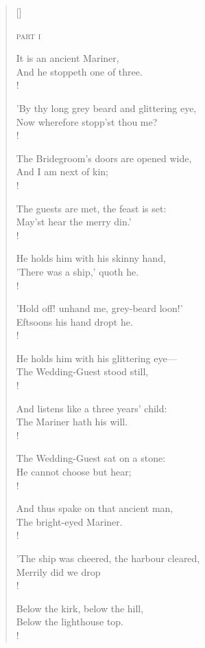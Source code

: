 \documentclass[12pt]{article}
\begin{document}
\begin{verse}[\linewidth]

\textsc{part i}

\bigskip
\bigskip

It is an ancient Mariner, \\
And he stoppeth one of three. \\!

'By thy long grey beard and glittering eye, \\
Now wherefore stopp'st thou me? \\!

The Bridegroom's doors are opened wide, \\
And I am next of kin; \\!

The guests are met, the feast is set: \\
May'st hear the merry din.' \\!

\bigskip

He holds him with his skinny hand, \\
'There was a ship,' quoth he. \\!

'Hold off! unhand me, grey-beard loon!' \\
Eftsoons his hand dropt he. \\!

\bigskip

He holds him with his glittering eye— \\
The Wedding-Guest stood still, \\!

And listens like a three years' child: \\
The Mariner hath his will. \\!

\bigskip

The Wedding-Guest sat on a stone: \\
He cannot choose but hear; \\!

And thus spake on that ancient man, \\
The bright-eyed Mariner. \\!

\bigskip

'The ship was cheered, the harbour cleared, \\
Merrily did we drop \\!

Below the kirk, below the hill, \\
Below the lighthouse top. \\!


\end{verse}
\end{document}
